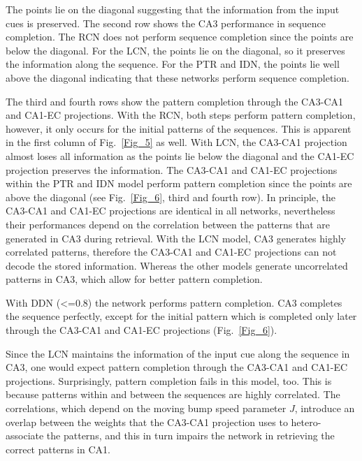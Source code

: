 \documentclass[utf8]{frontiersSCNS} %
\begin{document}
The points lie on the diagonal suggesting that the information from the input cues is preserved. The second row shows the CA3 performance in sequence completion. The RCN does not perform sequence completion since the points are below the diagonal. For the LCN, the points lie on the diagonal, so it preserves the information along the sequence. For the PTR and IDN, the points lie well above the diagonal indicating that these networks perform sequence completion.


      
%
The third and fourth rows show the pattern completion through the CA3-CA1 and CA1-EC projections. With the RCN, both steps perform pattern completion, however, it only occurs for the initial patterns of the sequences. This is apparent in the first column of Fig.~\ref{Fig_5} as well. With LCN, the CA3-CA1 projection almost loses all information as the points lie below the diagonal and the CA1-EC projection preserves the information.
%
The CA3-CA1 and CA1-EC projections within the PTR and IDN model perform pattern completion since the points are above the diagonal (see Fig.~\ref{Fig_6}, third and fourth row).  
%
In principle, the CA3-CA1 and CA1-EC projections are identical in all networks, nevertheless their performances depend on the correlation between the patterns that are generated in CA3 during retrieval. With the LCN model, CA3 generates highly correlated patterns, therefore the CA3-CA1 and CA1-EC projections can not decode the stored information. Whereas the other models generate uncorrelated patterns in CA3, which allow for better pattern completion.  





With DDN (<=0.8) the network performs pattern completion. CA3 completes the sequence perfectly, except for the initial pattern which is completed only later through the CA3-CA1 and CA1-EC projections (Fig.~\ref{Fig_6}).  


Since the LCN maintains the information of the input cue along the sequence in CA3, one would expect pattern completion through the CA3-CA1 and CA1-EC projections. Surprisingly, pattern completion fails in this model, too. This is because patterns within and between the sequences are highly correlated. The correlations, which depend on the moving bump speed parameter $J$, introduce an overlap between the weights that the CA3-CA1 projection uses to hetero-associate the patterns, and this in turn impairs the network in retrieving the correct patterns in CA1.
\end{document}
